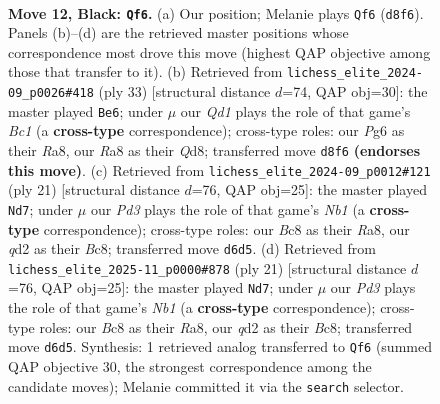 \documentclass[11pt]{article}
\begin{document}
\clearpage

\begin{figure}[p]\centering
\begin{subfigure}{0.46\textwidth}\centering
\resizebox{\linewidth}{!}{%
\newchessgame
\chessboard[
  setfen={r1bq1rk1/ppp2p1p/3p2p1/4b2n/2P1P3/2NB3P/PP1Q1PP1/R1B2RK1 b - - 4 12},
  showmover=false,
  pgfstyle=straightmove, color=movearrow, markmove={d8-f6}
]}
\caption{}
\end{subfigure}\hfill
\begin{subfigure}{0.46\textwidth}\centering
\resizebox{\linewidth}{!}{%
\newchessgame
\chessboard[
  setfen={r1bq1rk1/1p2ppbp/3p2p1/4n3/pPP1P3/P1NBB3/3Q1PPP/R4RK1 b - - 2 17},
  showmover=false,
  pgfstyle=straightmove, color=movearrow, markmove={c8-e6}
]}
\caption{}
\end{subfigure}
\\[4pt]
\begin{subfigure}{0.46\textwidth}\centering
\resizebox{\linewidth}{!}{%
\newchessgame
\chessboard[
  setfen={rnbqr1k1/pp3pp1/2pb1p2/8/3P1N1p/2PB4/PPQ2PPP/R1B2RK1 b - - 1 11},
  showmover=false,
  pgfstyle=straightmove, color=movearrow, markmove={b8-d7}
]}
\caption{}
\end{subfigure}\hfill
\begin{subfigure}{0.46\textwidth}\centering
\resizebox{\linewidth}{!}{%
\newchessgame
\chessboard[
  setfen={rnbqr1k1/pp3pp1/2pb1p2/8/3P1N1p/2PB4/PPQ2PPP/R1B2RK1 b - - 1 11},
  showmover=false,
  pgfstyle=straightmove, color=movearrow, markmove={b8-d7}
]}
\caption{}
\end{subfigure}
\caption{\textbf{Move 12, Black: \texttt{Qf6}.} (a) Our position; Melanie plays \texttt{Qf6} (\texttt{d8f6}). Panels (b)--(d) are the retrieved master positions whose correspondence most drove this move (highest QAP objective among those that transfer to it). (b) Retrieved from \texttt{lichess\_elite\_2024-09\_p0026\#418} (ply 33) [structural distance $d$=74, QAP obj=30]: the master played \texttt{Be6}; under $\mu$ our \emph{Qd1} plays the role of that game's \emph{Bc1} (a \textbf{cross-type} correspondence); cross-type roles: our \emph{P}g6 as their \emph{R}a8, our \emph{R}a8 as their \emph{Q}d8; transferred move \texttt{d8f6} \textbf{(endorses this move)}. (c) Retrieved from \texttt{lichess\_elite\_2024-09\_p0012\#121} (ply 21) [structural distance $d$=76, QAP obj=25]: the master played \texttt{Nd7}; under $\mu$ our \emph{Pd3} plays the role of that game's \emph{Nb1} (a \textbf{cross-type} correspondence); cross-type roles: our \emph{B}c8 as their \emph{R}a8, our \emph{q}d2 as their \emph{B}c8; transferred move \texttt{d6d5}. (d) Retrieved from \texttt{lichess\_elite\_2025-11\_p0000\#878} (ply 21) [structural distance $d$=76, QAP obj=25]: the master played \texttt{Nd7}; under $\mu$ our \emph{Pd3} plays the role of that game's \emph{Nb1} (a \textbf{cross-type} correspondence); cross-type roles: our \emph{B}c8 as their \emph{R}a8, our \emph{q}d2 as their \emph{B}c8; transferred move \texttt{d6d5}. Synthesis: 1 retrieved analog transferred to \texttt{Qf6} (summed QAP objective 30, the strongest correspondence among the candidate moves); Melanie committed it via the \texttt{search} selector.}
\label{fig:thought-m23}
\end{figure}
\end{document}
